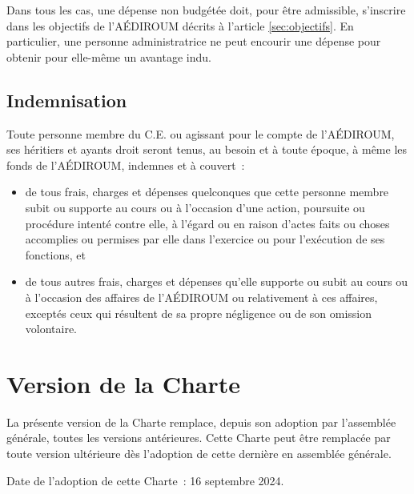 \documentclass{aediroum}
\newcommand{\article}[1]{article \ref{#1}}
\begin{document}
Dans tous les cas, une dépense non budgétée doit, pour être admissible, s'inscrire dans les objectifs de l'AÉDIROUM décrits à l'\article{sec:objectifs}. En particulier, une personne administratrice ne peut encourir une dépense pour obtenir pour elle-même un avantage indu.

\subsection{Indemnisation}\label{sec:indemnisation}

Toute personne membre du C.E. ou agissant pour le compte de l’AÉDIROUM, ses héritiers et ayants droit seront tenus, au besoin et à toute époque, à même les fonds de l'AÉDIROUM, indemnes et à couvert~:
\begin{itemize}
\item de tous frais, charges et dépenses quelconques que cette personne membre subit ou supporte au cours ou à l'occasion d'une action, poursuite ou procédure intenté contre elle, à l'égard ou en raison d'actes faits ou choses accomplies ou permises par elle dans l'exercice ou pour l'exécution de ses fonctions, et
\item de tous autres frais, charges et dépenses qu'elle supporte ou subit au cours ou à l'occasion des affaires de l'AÉDIROUM ou relativement à ces affaires, exceptés ceux qui résultent de sa propre négligence ou de son omission volontaire.
\end{itemize}

\section{Version de la Charte}\label{sec:version-de-la-Charte}
La présente version de la Charte remplace, depuis son adoption par l'assemblée générale, toutes les versions antérieures. Cette Charte peut être remplacée par toute version ultérieure dès l'adoption de cette dernière en assemblée générale.

Date de l'adoption de cette Charte~: 16 septembre 2024.
\end{document}
